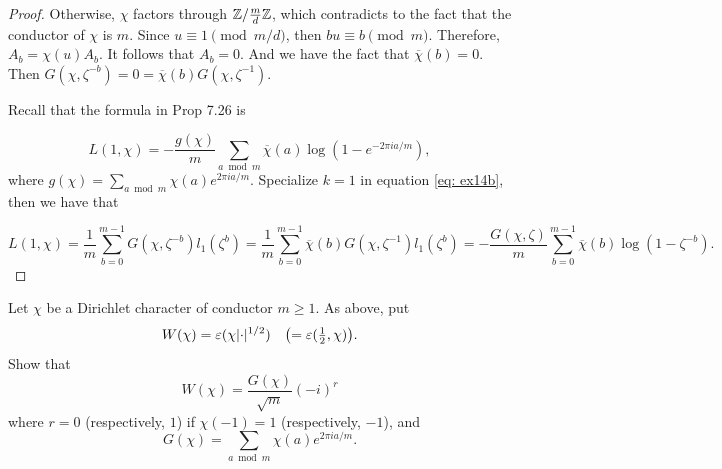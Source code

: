 \begin{proof}
  Otherwise, $\chi$ factors through $\mathbb{Z} / \frac{m}{d}\mathbb{Z}$, which contradicts to the fact that the
  conductor of $\chi$ is $m$. Since $u \equiv 1 \pmod{m / d}$, then $bu \equiv b \pmod{m}$. Therefore,
  $A_b=\chi(u) A_b$. It follows that $A_b = 0$. And we have the fact that $\overline{\chi}(b) = 0$.
  Then $G(\chi, \zeta^{-b}) = 0 = \overline{\chi}(b) G(\chi, \zeta^{-1})$.

  Recall that the formula in Prop 7.26 is

  \[L(1, \chi) = - \frac{g(\chi)}{m}\sum_{a \bmod m} \overline{\chi}(a)
  \log (1 - e ^ {- 2\pi i a / m}), \]
  where $g(\chi) = \sum_{a \bmod m} \chi(a) e^{2\pi i a / m}$.
  Specialize $k = 1$ in equation \eqref{eq: ex14b}, then we have that

  \[L(1, \chi) = \frac{1}{m} \sum_{b = 0}^{m-1} G(\chi, \zeta^{-b}) l_1(\zeta^b) =
  \frac{1}{m}\sum_{b=0}^{m-1} \overline{\chi}(b) G(\chi, \zeta^{-1}) l_1(\zeta^b) =
  -\frac{G(\chi, \zeta)}{m} \sum_{b=0}^{m-1} \overline{\chi}(b) \log(1 - \zeta^{-b}). \]


\end{proof}

\begin{exercise}[15]
  \label{ex:ch7-15}
  Let $\chi$ be a Dirichlet character of conductor $m \ge 1$. As above, put
  \[
    W(\chi) = \varepsilon(\chi\lvert\cdot\rvert^{1/2})
    \quad \bigl(= \varepsilon(\tfrac12, \chi)\bigr).
  \]
  Show that
  \[
    W(\chi) = \frac{G(\chi)}{\sqrt{m}} (-i)^r
  \]
  where $r = 0$ (respectively, $1$) if $\chi(-1) = 1$ (respectively, $-1$),
  and
  \[
    G(\chi) = \sum_{a \bmod m} \chi(a) e^{2\pi i a/m}.
  \]
\end{exercise}
